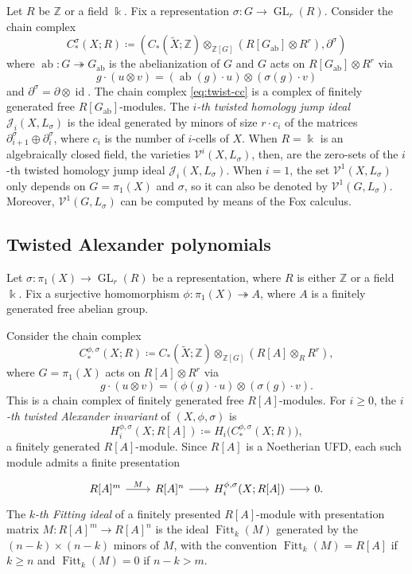 \documentclass[11pt]{amsart}
\theoremstyle{definition}
\newcommand{\Z}{\mathbb{Z}}
\renewcommand{\k}{\Bbbk}
\newcommand{\VV}{\mathcal{V}}
\newcommand{\cJ}{\mathcal{J}}
\DeclareMathOperator{\id}{id}
\DeclareMathOperator{\ab}{{ab}}
\DeclareMathOperator{\GL}{GL}
\DeclareMathOperator{\Fitt}{{Fitt}}
\newcommand{\surj}{\twoheadrightarrow}
\begin{document}
Let $R$ be $\Z$ or a field $\k$. Fix a representation $\sigma\colon G \to \GL_r(R)$. 
Consider the chain complex 
\begin{equation}
\label{eq:twist-cc}
C_*^\sigma(X ; R) \coloneqq (C_{*}(\widetilde{X};\Z) \otimes_{\Z[G]} 
(R[G_{\ab}] \otimes R^r), \partial^{\sigma})
\end{equation}
where $\ab\colon G\surj G_{\ab}$ is the abelianization of $G$ and 
$G$ acts on $R[G_{\ab}] \otimes R^r$ via 
\[
g \cdot (u\otimes v) = (\ab(g)\cdot u)\otimes (\sigma(g) \cdot v)
\]
and $\partial^{\sigma} =\partial \otimes \id$. 
The chain complex \eqref{eq:twist-cc} is a complex of finitely 
generated free $R[G_{\ab}]$-modules. 
The {\em $i$-th twisted homology jump ideal}\/ $\cJ_i(X,L_\sigma)$ is the ideal
generated by minors of size $r\cdot c_i$ of the matrices 
$\partial^\sigma_{i+1} \oplus \partial^\sigma_{i}$, where $c_i$ 
is the number of $i$-cells of $X$. When $R=\k$ is an algebraically 
closed field, the varieties $\VV^i(X,L_\sigma)$, then, are the 
zero-sets of the $i$-th twisted homology jump ideal $\cJ_i(X,L_\sigma)$.
When $i=1$, the set $\VV^1(X,L_{\sigma})$ only depends on 
$G=\pi_1(X)$ and $\sigma$, so it can also be denoted by $\VV^1(G,L_{\sigma})$.
Moreover, $\VV^1(G,L_{\sigma})$ can be computed by means of the Fox calculus.

\subsection{Twisted Alexander polynomials}
\label{subsec:twist-alex}

Let $\sigma\colon \pi_1(X)\to \GL_r(R)$ be a representation, where $R$ is 
either $\Z$ or a field $\k$. Fix a surjective homomorphism 
$\phi\colon \pi_1(X) \twoheadrightarrow A$, where $A$ is a 
finitely generated free abelian group. 

Consider the chain complex
\begin{equation}
\label{eq:twist-cc2}
C_*^{\phi,\sigma}(X ;R) \coloneqq 
C_{*}(\widetilde{X};\Z) \otimes_{\Z[G]} (R[A] \otimes_R R^r),
\end{equation}
where $G=\pi_1(X)$ acts on $R[A] \otimes R^r$ via 
\[
g \cdot (u\otimes v) = (\phi(g)\cdot u)\otimes (\sigma(g) \cdot v).
\]
This is a chain complex of finitely generated free $R[A]$-modules. 
For $i\geq 0$, the \emph{$i$-th twisted Alexander invariant} of 
$(X,\phi,\sigma)$ is
\begin{equation}
\label{eq:twist-alex-mod}
H_i^{\phi,\sigma}(X;R[A])\coloneqq H_i\bigl(C_*^{\phi,\sigma}(X ;R)\bigr),
\end{equation}
a finitely generated $R[A]$-module. Since $R[A]$ is a Noetherian UFD, 
each such module admits a finite presentation
\[
\begin{tikzcd}[column sep=18pt]
R[A]^m \ar[r, "M"] &[4pt] R[A]^n \ar[r] &H_i^{\phi,\sigma}(X;R[A]) \ar[r] & 0.
\end{tikzcd}
\]
The \emph{$k$-th Fitting ideal} of a finitely presented $R[A]$-module 
with presentation matrix $M\colon R[A]^m\to R[A]^n$ is the ideal
$\Fitt_k(M)$ generated by the $(n-k)\times(n-k)$ minors of $M$,
with the convention $\Fitt_k(M)=R[A]$ if $k\geq n$ and 
$\Fitt_k(M)=0$ if $n-k>m$.
\end{document}
